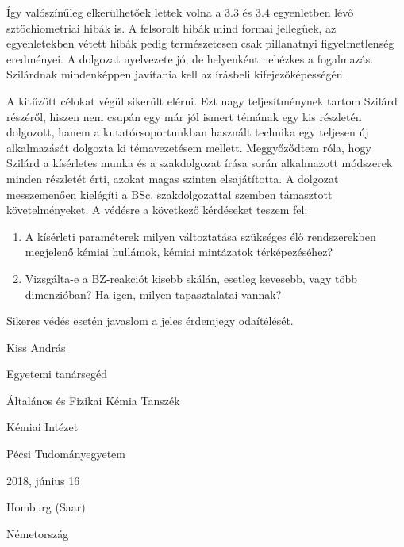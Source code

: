 \documentclass[a4paper, 11pt, oneside, bibliography=totoc]{article}
\begin{document}
Így valószínűleg elkerülhetőek lettek volna a 3.3 és 3.4 egyenletben lévő sztöchiometriai hibák is. A felsorolt hibák mind formai jellegűek, az egyenletekben vétett hibák pedig természetesen csak pillanatnyi figyelmetlenség eredményei. A dolgozat nyelvezete jó, de helyenként nehézkes a fogalmazás. Szilárdnak mindenképpen javítania kell az írásbeli kifejezőképességén.

A kitűzött célokat végül sikerült elérni. Ezt nagy teljesítménynek tartom Szilárd részéről, hiszen nem csupán egy már jól ismert témának egy kis részletén dolgozott, hanem a kutatócsoportunkban használt technika egy teljesen új alkalmazását dolgozta ki témavezetésem mellett. Meggyőződtem róla, hogy Szilárd a kísérletes munka és a szakdolgozat írása során alkalmazott módszerek minden részletét érti, azokat magas szinten elsajátította. A dolgozat messzemenően kielégíti a BSc. szakdolgozattal szemben támasztott követelményeket. A védésre a következő kérdéseket teszem fel:

\begin{enumerate}
\item A kísérleti paraméterek milyen változtatása szükséges élő rendszerekben megjelenő kémiai hullámok, kémiai mintázatok térképezéséhez?
\item Vizsgálta-e a BZ-reakciót kisebb skálán, esetleg kevesebb, vagy több dimenzióban? Ha igen, milyen tapasztalatai vannak?
\end{enumerate}

Sikeres védés esetén javaslom a jeles érdemjegy odaítélését.

Kiss András

Egyetemi tanársegéd

Általános és Fizikai Kémia Tanszék

Kémiai Intézet

Pécsi Tudományegyetem


2018, június 16

Homburg (Saar)

Németország
\end{document}
